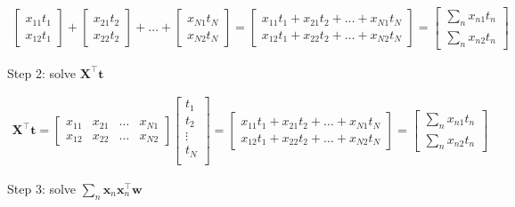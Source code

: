 \documentclass[10pt]{article}
\begin{document}
\begin{enumerate}
\begin{eqnarray*}
    \begin{bmatrix}
	x_{11}t_1 \\[0.3em]
    x_{12}t_1
    \end{bmatrix} +
    \begin{bmatrix}
	x_{21}t_2 \\[0.3em]
    x_{22}t_2
    \end{bmatrix} +
    \dots +
    \begin{bmatrix}
	x_{N1}t_N \\[0.3em]
    x_{N2}t_N
    \end{bmatrix} =
    \begin{bmatrix}
    x_{11}t_1 + x_{21}t_2 + \dots + x_{N1}t_N \\[0.3em]
    x_{12}t_1 + x_{22}t_2 + \dots + x_{N2}t_N 
    \end{bmatrix} =
    \begin{bmatrix}
    \sum_{n} x_{n1}t_n \\[0.3em]
    \sum_{n} x_{n2}t_n
    \end{bmatrix}
\end{eqnarray*}

Step 2: solve $\mathbf{X}^\top\mathbf{t}$

\begin{eqnarray*}
\mathbf{X}^\top\mathbf{t} = 
	\begin{bmatrix}
	x_{11} & x_{21} & \dots & x_{N1} \\[0.3em]
    x_{12} & x_{22} & \dots & x_{N2}
	\end{bmatrix}
    \begin{bmatrix}
    t_1 \\[0.3em]
    t_2 \\[0.3em]
    \vdots \\[0.3em]
    t_N \\[0.3em]
    \end{bmatrix} =
    \begin{bmatrix}
    x_{11}t_1 + x_{21}t_2 + \dots + x_{N1}t_N \\[0.3em]
    x_{12}t_1 + x_{22}t_2 + \dots + x_{N2}t_N 
    \end{bmatrix} =
    \begin{bmatrix}
    \sum_{n} x_{n1}t_n \\[0.3em]
    \sum_{n} x_{n2}t_n
    \end{bmatrix}    
\end{eqnarray*}

Step 3: solve $\sum_{n} \mathbf{x}_n \mathbf{x}_n ^\top \mathbf{w}$


\end{enumerate}
\end{document}
